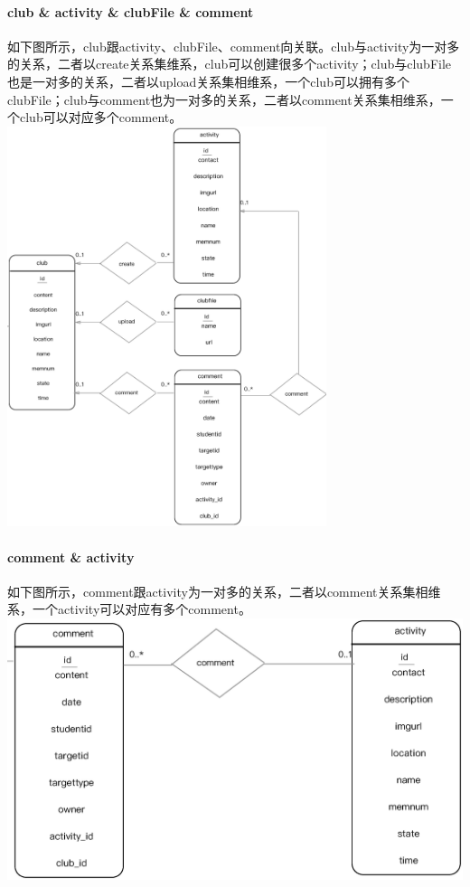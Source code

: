 \documentclass[UTF8]{ctexart}
\begin{document}
\paragraph{club \& activity \& clubFile \& comment}
如下图所示，club跟activity、clubFile、comment向关联。club与activity为一对多的关系，二者以create关系集维系，club可以创建很多个activity；club与clubFile也是一对多的关系，二者以upload关系集相维系，一个club可以拥有多个clubFile；club与comment也为一对多的关系，二者以comment关系集相维系，一个club可以对应多个comment。
\newline
\includegraphics[width = 0.7\textwidth]{club-*-er.eps}
\paragraph{comment \& activity}
如下图所示，comment跟activity为一对多的关系，二者以comment关系集相维系，一个activity可以对应有多个comment。
\newline
\includegraphics[width = 1.0\textwidth]{activity-comment-er.eps}
\end{document}
